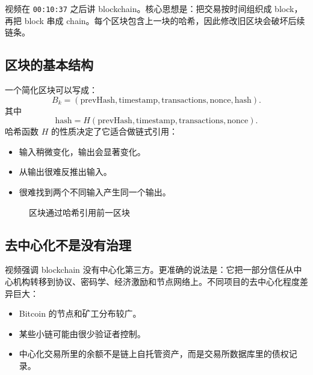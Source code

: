 \documentclass[UTF8,11pt]{ctexart}
\newcommand{\timestamp}[1]{\textcolor{blue!50!black}{\texttt{#1}}}
\begin{document}
视频在 \timestamp{00:10:37} 之后讲 blockchain。核心思想是：把交易按时间组织成 block，再把 block 串成 chain。每个区块包含上一块的哈希，因此修改旧区块会破坏后续链条。

\subsection{区块的基本结构}

一个简化区块可以写成：
\[
B_k = (\text{prevHash}, \text{timestamp}, \text{transactions}, \text{nonce}, \text{hash}).
\]
其中
\[
\text{hash} = H(\text{prevHash}, \text{timestamp}, \text{transactions}, \text{nonce}).
\]
哈希函数 \(H\) 的性质决定了它适合做链式引用：
\begin{itemize}
  \item 输入稍微变化，输出会显著变化。
  \item 从输出很难反推出输入。
  \item 很难找到两个不同输入产生同一个输出。
\end{itemize}

\begin{figure}[h]
\centering
{}
\caption{区块通过哈希引用前一区块}
\end{figure}

\subsection{去中心化不是没有治理}

视频强调 blockchain 没有中心化第三方。更准确的说法是：它把一部分信任从中心机构转移到协议、密码学、经济激励和节点网络上。不同项目的去中心化程度差异巨大：
\begin{itemize}
  \item Bitcoin 的节点和矿工分布较广。
  \item 某些小链可能由很少验证者控制。
  \item 中心化交易所里的余额不是链上自托管资产，而是交易所数据库里的债权记录。
\end{itemize}
\end{document}
